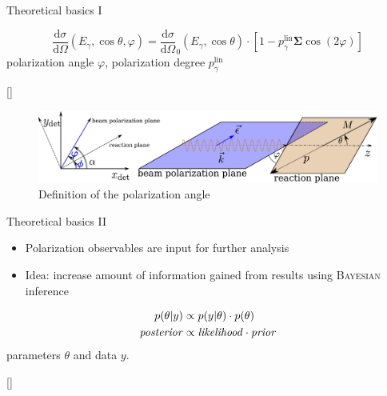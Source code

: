 \documentclass[11pt,aspectratio=169,dvipsnames]{beamer}
\newcommand{\thecolor}{black!70!blue}
\begin{document}
\begin{frame}{Theoretical basics I}
		
		
		
		\begin{tcolorbox}[colback=blue!5,colframe=\thecolor,title=Beam asymmetry $\boldsymbol{\Sigma}$]
			$$\frac{\text{d}\sigma}{\text{d}\Omega}(E_\gamma,\cos\theta,\varphi)=\frac{\text{d}\sigma}{\text{d}\Omega}_0(E_\gamma,\cos\theta)\cdot\left[1-p_\gamma^{\text{lin}}\boldsymbol{\Sigma}\cos(2\varphi)\right]$$
			polarization angle $\varphi$, polarization degree $p_\gamma^{\text{lin}}$
			\begin{flushright}
				{}
			\end{flushright}
		\end{tcolorbox}
		
		\begin{figure}
			\centering
			\includegraphics[width=.8\linewidth]{angles.pdf}
			\caption*{Definition of the polarization angle}
		\end{figure}
	\end{frame}
	\begin{frame}{Theoretical basics II}
	\begin{itemize}
		\item Polarization observables are input for further analysis
		\item Idea: increase amount of information gained from results using \textsc{Bayesian} inference 
	\end{itemize}
	\begin{tcolorbox}[colback=blue!5,colframe=\thecolor,title=\textsc{Bayes'} theorem]
		\begin{align*}
			p(\theta|y)&\propto p(y|\theta)\cdot p(\theta)\\
			\text{\emph{posterior}}&\propto\text{\emph{likelihood}}\cdot\text{\emph{prior}}
		\end{align*}
		parameters $\theta$ and data $y$.
		
		
		\begin{flushright}
			{\scriptsize[\cite{bayes}]}
		\end{flushright}
	\end{tcolorbox}
	\end{frame}
\end{document}
